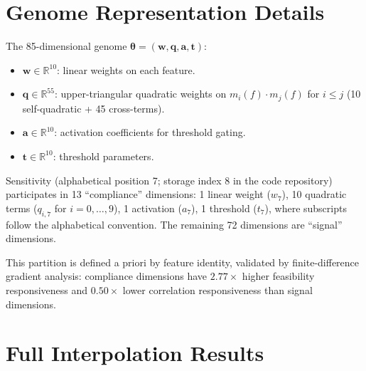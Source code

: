\documentclass[twoside]{article}
\newcommand{\R}{\mathbb{R}}
\newcommand{\btheta}{\boldsymbol{\theta}}
\begin{document}
\section{Genome Representation Details}
\label{app:genome}

The 85-dimensional genome $\btheta = (\mathbf{w}, \mathbf{q}, \mathbf{a}, \mathbf{t})$:

\begin{itemize}
\item $\mathbf{w} \in \R^{10}$: linear weights on each feature.
\item $\mathbf{q} \in \R^{55}$: upper-triangular quadratic weights on
  $m_i(f) \cdot m_j(f)$ for $i \leq j$ (10 self-quadratic + 45 cross-terms).
\item $\mathbf{a} \in \R^{10}$: activation coefficients for threshold gating.
\item $\mathbf{t} \in \R^{10}$: threshold parameters.
\end{itemize}

Sensitivity (alphabetical position 7; storage index 8 in the code repository)
participates in 13 ``compliance'' dimensions: 1 linear weight ($w_7$),
10 quadratic terms ($q_{i,7}$ for $i = 0, \ldots, 9$), 1 activation ($a_7$),
1 threshold ($t_7$), where subscripts follow the alphabetical convention.
The remaining
72 dimensions are ``signal'' dimensions.

This partition is defined a priori by feature identity, validated by
finite-difference gradient analysis: compliance dimensions have $2.77\times$
higher feasibility responsiveness and $0.50\times$ lower correlation
responsiveness than signal dimensions.

\section{Full Interpolation Results}
\label{app:interpolation}
\end{document}
